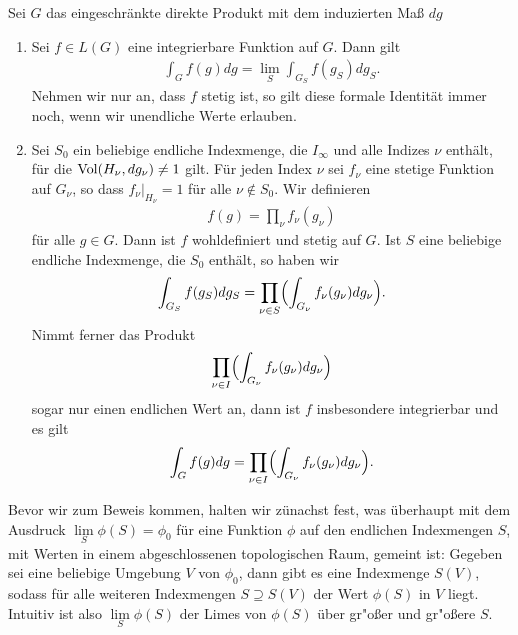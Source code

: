 		\begin{proposition}\label{prop:rdp:integrieren}
			Sei $G$ das eingeschränkte direkte Produkt mit dem induzierten Maß $dg$
			\begin{enumerate}[label=(\roman*)]
				\item Sei $f \in L(G)$ eine integrierbare Funktion auf $G$. Dann gilt
					\begin{align*}
						\int_G f(g)dg = \lim_S \int_{G_S} f(g_S) dg_S.
					\end{align*}
					Nehmen wir nur an, dass $f$ stetig ist, so gilt diese formale Identität immer noch, wenn wir unendliche Werte erlauben.
				\item Sei $S_0$ ein beliebige endliche Indexmenge, die $I_\infty$ und alle Indizes $\nu$ enthält, für die $\operatorname{Vol}(H_\nu, dg_\nu) \not= 1$ gilt. 
					Für jeden Index $\nu$ sei $f_\nu$ eine stetige Funktion auf $G_\nu$, so dass $f_\nu |_{H_\nu} = 1$ für alle $\nu \notin S_0$. 
					Wir definieren
					\begin{align*}
						f(g) = \prod_{\nu}f_\nu(g_\nu)
					\end{align*} 
					für alle $g\in G$. Dann ist $f$ wohldefiniert und stetig auf $G$. 
					Ist $S$ eine beliebige endliche Indexmenge, die $S_0$ enthält, so haben wir
					\begin{align}\label{eq:satz:integration}
						\int_{G_S} f(g_S) dg_S = \prod_{\nu\in S}\Bigl(\int_{G_\nu} f_\nu (g_\nu)dg_\nu\Bigr).
					\end{align}
					Nimmt ferner das Produkt
					\begin{align}\label{eq:rdp:produkt}
						\prod_{\nu\in I}\Bigl(\int_{G_\nu} f_\nu (g_\nu)dg_\nu\Bigr)
					\end{align}
					sogar nur einen endlichen Wert an, dann ist $f$ insbesondere integrierbar und es gilt
					\begin{align*}
						\int_{G} f(g) dg = \prod_{\nu\in I}\Bigl(\int_{G_\nu} f_\nu (g_\nu)dg_\nu\Bigr).
					\end{align*}	
			\end{enumerate}
		\end{proposition}
		Bevor wir zum Beweis kommen, halten wir zünachst fest, was überhaupt mit dem Ausdruck $\lim\limits_S \phi(S) = \phi_0$ für eine Funktion $\phi$ auf den endlichen Indexmengen $S$, mit Werten in einem abgeschlossenen topologischen Raum, gemeint ist: 
		Gegeben sei eine beliebige Umgebung $V$ von $\phi_0$, dann gibt es eine Indexmenge $S(V)$, sodass für alle weiteren Indexmengen $S \supseteq S(V)$ der Wert $\phi(S)$ in $V$ liegt. 
		Intuitiv ist also $\lim\limits_S \phi(S)$ der Limes von $\phi(S)$ über gr"oßer und gr"oßere $S$.
			
